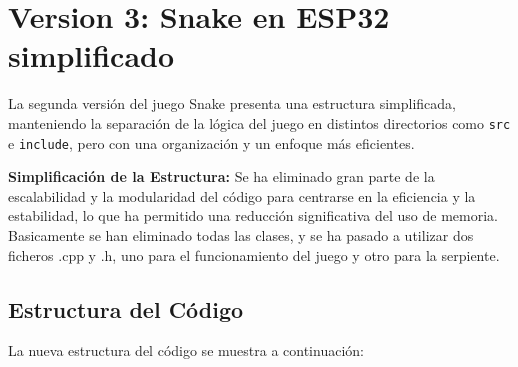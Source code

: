 
\section{Version 3: Snake en ESP32 simplificado}

La segunda versión del juego Snake presenta una estructura simplificada, manteniendo la separación de la lógica del juego en distintos directorios como \texttt{src} e \texttt{include}, pero con una organización y un enfoque más eficientes.

\textbf{Simplificación de la Estructura:} Se ha eliminado gran parte de la escalabilidad y la modularidad del código para centrarse en la eficiencia y la estabilidad, lo que ha permitido una reducción significativa del uso de memoria. Basicamente se han eliminado todas las clases, y se ha pasado a utilizar dos ficheros .cpp y .h, uno para el funcionamiento del juego y otro para la serpiente.

\subsection{Estructura del Código}

La nueva estructura del código se muestra a continuación:

